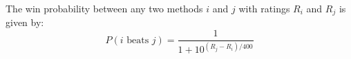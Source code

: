 The win probability between any two methods $i$ and $j$ with ratings $R_i$ and $R_j$ is given by:
\[
P(i \text{ beats } j) = \frac{1}{1 + 10^{(R_j - R_i)/400}}
\]







